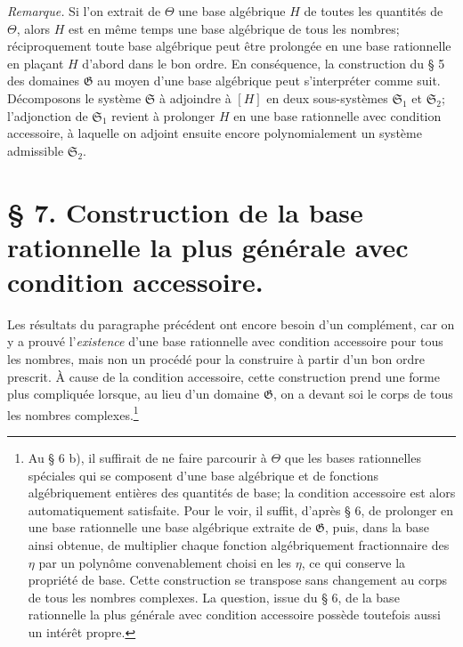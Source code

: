 \emph{Remarque.} Si l'on extrait de $\Theta$ une base algébrique $H$ de toutes les quantités de $\Theta$, alors $H$ est en même temps une base algébrique de tous les nombres; réciproquement toute base algébrique peut être prolongée en une base rationnelle en plaçant $H$ d'abord dans le bon ordre. En conséquence, la construction du \S{} 5 des domaines $\mathfrak G$ au moyen d'une base algébrique peut s'interpréter comme suit. Décomposons le système $\mathfrak S$ à adjoindre à $[H]$ en deux sous-systèmes $\mathfrak S_1$ et $\mathfrak S_2$; l'adjonction de $\mathfrak S_1$ revient à prolonger $H$ en une base rationnelle avec condition accessoire, à laquelle on adjoint ensuite encore polynomialement un système admissible $\mathfrak S_2$.

\section*{\S{} 7. Construction de la base rationnelle la plus générale avec condition accessoire.}

Les résultats du paragraphe précédent ont encore besoin d'un complément, car on y a prouvé l'\emph{existence} d'une base rationnelle avec condition accessoire pour tous les nombres, mais non un procédé pour la construire à partir d'un bon ordre prescrit. À cause de la condition accessoire, cette construction prend une forme plus compliquée lorsque, au lieu d'un domaine $\mathfrak G$, on a devant soi le corps de tous les nombres complexes.\footnote{Au \S{} 6 b), il suffirait de ne faire parcourir à $\Theta$ que les bases rationnelles spéciales qui se composent d'une base algébrique et de fonctions algébriquement entières des quantités de base; la condition accessoire est alors automatiquement satisfaite. Pour le voir, il suffit, d'après \S{} 6, de prolonger en une base rationnelle une base algébrique extraite de $\mathfrak G$, puis, dans la base ainsi obtenue, de multiplier chaque fonction algébriquement fractionnaire des $\eta$ par un polynôme convenablement choisi en les $\eta$, ce qui conserve la propriété de base. Cette construction se transpose sans changement au corps de tous les nombres complexes. La question, issue du \S{} 6, de la base rationnelle la plus générale avec condition accessoire possède toutefois aussi un intérêt propre.}

